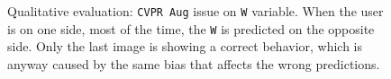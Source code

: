\begin{figure}[H]
\begin{center}
\begin{subfigure}[h]{0.49\textwidth}
		\end{subfigure}
	\end{center}
	\vspace{-0.5cm}
	\caption[Qualitative evaluation: \texttt{CVPR Aug} issue on \texttt{W} variable]{Qualitative evaluation: \texttt{CVPR Aug} issue on \texttt{W} variable. When the user is on one side, most of the time, the \texttt{W} is predicted on the opposite side. Only the last image is showing a correct behavior, which is anyway caused by the same bias that affects the wrong predictions.}
	\label{fig:ql-sim-w-bias}
\end{figure}